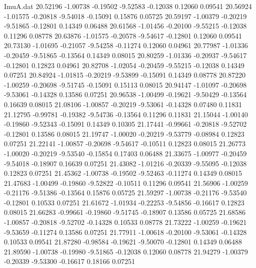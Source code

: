 \begin{filecontents}{ImuA.dat}
  20.52196   -1.00738   -0.19502   -9.52583   -0.12038    0.12060    0.09541
  20.56924   -1.01575   -0.20818   -9.54018   -0.15091    0.15876    0.05725
  20.59197   -1.00379   -0.20219   -9.51865   -0.12801    0.14349    0.06488
  20.61568   -1.01456   -0.20100   -9.55215   -0.12038    0.11296    0.08778
  20.63876   -1.01575   -0.20578   -9.54617   -0.12801    0.12060    0.09541
  20.73130   -1.01695   -0.21057   -9.54258   -0.11274    0.12060    0.04961
  20.77987   -1.01336   -0.20459   -9.51865   -0.13564    0.14349    0.08015
  20.80259   -1.01336   -0.20937   -9.54617   -0.12801    0.12823    0.04961
  20.82708   -1.02054   -0.20459   -9.55215   -0.12038    0.14349    0.07251
  20.84924   -1.01815   -0.20219   -9.53899   -0.15091    0.14349    0.08778
  20.87220   -1.00259   -0.20698   -9.51745   -0.15091    0.15113    0.08015
  20.94147   -1.01097   -0.20698   -9.53061   -0.14328    0.13586    0.07251
  20.96538   -1.00499   -0.19621   -9.50429   -0.13564    0.16639    0.08015
  21.08106   -1.00857   -0.20219   -9.53061   -0.14328    0.07480    0.11831
  21.12795   -0.99781   -0.19382   -9.54736   -0.13564    0.11296    0.11831
  21.15044   -1.00140   -0.19860   -9.52343   -0.15091    0.14349    0.10305
  21.17441   -0.99661   -0.20818   -9.52702   -0.12801    0.13586    0.08015
  21.19747   -1.00020   -0.20219   -9.53779   -0.08984    0.12823    0.07251
  21.22141   -1.00857   -0.20698   -9.54617   -0.10511    0.12823    0.08015
  21.26773   -1.00020   -0.20219   -9.53540   -0.15854    0.17403    0.06488
  21.33675   -1.00977   -0.20459   -9.54018   -0.18907    0.16639    0.07251
  21.43082   -1.01216   -0.20339   -9.55095   -0.12038    0.12823    0.07251
  21.45362   -1.00738   -0.19502   -9.52463   -0.11274    0.14349    0.08015
  21.47683   -1.00499   -0.19860   -9.52822   -0.10511    0.11296    0.09541
  21.56906   -1.00259   -0.21176   -9.51386   -0.13564    0.15876    0.05725
  21.59297   -1.00738   -0.21176   -9.53540   -0.12801    0.10533    0.07251
  21.61672   -1.01934   -0.22253   -9.54856   -0.16617    0.12823    0.08015
  21.66283   -0.99661   -0.19860   -9.51745   -0.18907    0.13586    0.05725
  21.68586   -1.00857   -0.20818   -9.52702   -0.14328    0.10533    0.08778
  21.73222   -1.00259   -0.19621   -9.53659   -0.11274    0.13586    0.07251
  21.77911   -1.00618   -0.20100   -9.53061   -0.14328    0.10533    0.09541
  21.87280   -0.98584   -0.19621   -9.50070   -0.12801    0.14349    0.06488
  21.89590   -1.00738   -0.19980   -9.51865   -0.12038    0.12060    0.08778
  21.94279   -1.00379   -0.20339   -9.53300   -0.16617    0.18166    0.07251

\end{filecontents}
